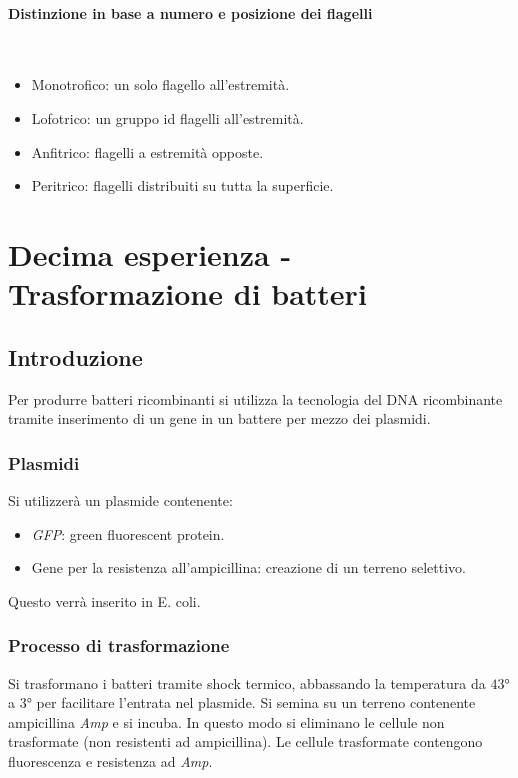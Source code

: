 			\paragraph{Distinzione in base a numero e posizione dei flagelli}\mbox{}\\
			\begin{multicols}{2}
				\begin{itemize}
					\item Monotrofico: un solo flagello all'estremit\`a.
					\item Lofotrico: un gruppo id flagelli all'estremit\`a.
					\item Anfitrico: flagelli a estremit\`a opposte.
					\item Peritrico: flagelli distribuiti su tutta la superficie.
				\end{itemize}
			\end{multicols}

\section{Decima esperienza - Trasformazione di batteri}

	\subsection{Introduzione}
	Per produrre batteri ricombinanti si utilizza la tecnologia del DNA ricombinante tramite inserimento di un gene in un battere per mezzo dei plasmidi.

		\subsubsection{Plasmidi}
		Si utilizzer\`a un plasmide contenente:
		\begin{multicols}{2}
			\begin{itemize}
				\item \emph{GFP}: green fluorescent protein.
				\item Gene per la resistenza all'ampicillina: creazione di un terreno selettivo.
			\end{itemize}
		\end{multicols}
		Questo verr\`a inserito in E. coli.

		\subsubsection{Processo di trasformazione}
		Si trasformano i batteri tramite shock termico, abbassando la temperatura da $43\si{\degree}$ a $3\si{\degree}$ per facilitare l'entrata nel plasmide.
		Si semina su un terreno contenente ampicillina \emph{Amp} e si incuba.
		In questo modo si eliminano le cellule non trasformate (non resistenti ad ampicillina).
		Le cellule trasformate contengono fluorescenza e resistenza ad \emph{Amp}.



